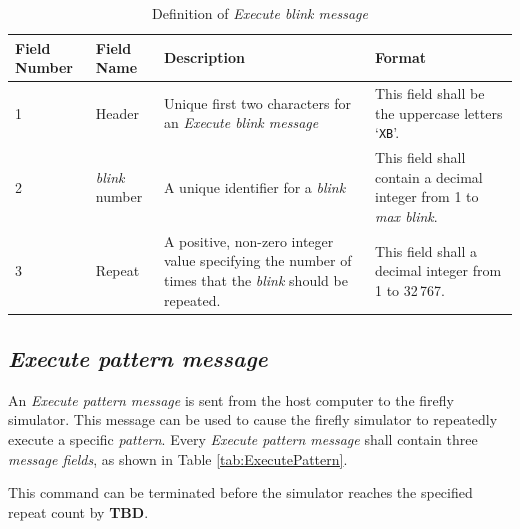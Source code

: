 \documentclass[letterpaper,11pt]{article}
\begin{document}
\begin{table}[H]
  \caption{Definition of \textit{Execute blink message}}
  \centering
  \setlength\extrarowheight{2pt}
  \begin{tabular}[h]{|p{0.5in}|p{1.00in}|p{2.25in}|p{2.25in}|} \hline
    Field Number & Field Name & Description & Format \\ \hline
    1            & Header
                 & Unique first two characters for an \textit{Execute blink
                 message}
                 & This field shall be the uppercase letters `\texttt{XB}'.
                 \\ \hline
    2            & \textit{blink} number
                 & A unique identifier for a \textit{blink}
                 & This field shall contain a decimal integer from 1 to
                 \textit{max blink}.
                 \\ \hline
    3            & Repeat
                 & A positive, non-zero integer value specifying the number
                 of times that the \textit{blink} should be repeated. 
                 & This field shall a decimal integer from 1 to 32\,767.
    \\ \hline
  \end{tabular}
  \label{tab:ExecuteBlink}
\end{table}

\subsection{\textit{Execute pattern message}}

An \textit{Execute pattern message} is sent from the host computer to the
firefly simulator. This message can be used to cause the firefly simulator to
repeatedly execute a specific \textit{pattern}. Every \textit{Execute pattern
message} shall contain three \textit{message fields}, as shown in Table
\ref{tab:ExecutePattern}.

This command can be terminated before the simulator reaches the specified
repeat count by \textbf{TBD}.
\end{document}
